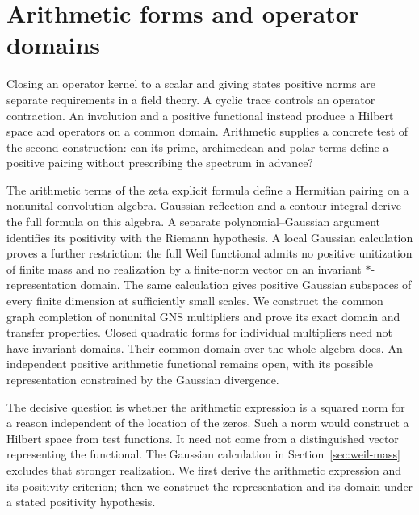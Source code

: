 \chapter{Arithmetic forms and operator domains}
\label{chap:weil-operator-domains}
\begingroup
{}
\newcommand{\cA}{\mathcal A}
\newcommand{\cN}{\mathcal N}
\newcommand{\R}{\mathbb R}
\newcommand{\C}{\mathbb C}
\newcommand{\Z}{\mathbb Z}
\newcommand{\A}{\mathcal A}
\newcommand{\Res}{\operatorname{Res}}

Closing an operator kernel to a scalar and giving states positive norms
are separate requirements in a field theory.
A cyclic trace controls an operator contraction.  An involution and a
positive functional instead produce a Hilbert space and operators on a
common domain.  Arithmetic supplies a concrete test of the second
construction: can its prime, archimedean and polar terms define a positive
pairing without prescribing the spectrum in advance?

The arithmetic terms of the zeta explicit formula define a Hermitian
pairing on a nonunital convolution algebra.  Gaussian reflection and a
contour integral derive the full formula on this algebra.  A separate
polynomial--Gaussian argument identifies its positivity with the Riemann
hypothesis.  A local Gaussian calculation proves a further
restriction: the full Weil functional admits no positive unitization of
finite mass and no realization by a finite-norm vector on an invariant
$*$-representation domain.  The same calculation gives positive Gaussian
subspaces of every finite dimension at sufficiently small scales.
We construct the common graph completion of
nonunital GNS multipliers and prove its exact domain and transfer
properties.  Closed quadratic forms for individual multipliers need not
have invariant domains.  Their common domain over the whole algebra does.
An independent positive arithmetic functional remains open, with its
possible representation constrained by the Gaussian divergence.


The decisive question is whether the arithmetic expression is a squared
norm for a reason independent of the location of the zeros.
Such a norm would construct a Hilbert space from test functions.
It need not come from a distinguished vector representing the functional.
The Gaussian calculation in Section~\ref{sec:weil-mass} excludes that
stronger realization.  We first derive the arithmetic expression and its
positivity criterion; then we construct the representation and its domain
under a stated positivity hypothesis.

